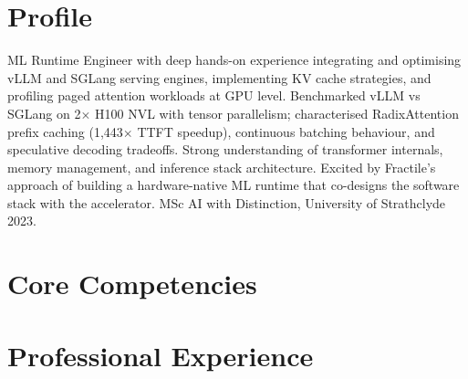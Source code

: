 \documentclass[11pt,a4paper]{moderncv}
\begin{document}
\makecvtitle

\section{Profile}
ML Runtime Engineer with deep hands-on experience integrating and optimising vLLM and SGLang serving engines, implementing KV cache strategies, and profiling paged attention workloads at GPU level. Benchmarked vLLM vs SGLang on 2$\times$ H100 NVL with tensor parallelism; characterised RadixAttention prefix caching (1,443$\times$ TTFT speedup), continuous batching behaviour, and speculative decoding tradeoffs. Strong understanding of transformer internals, memory management, and inference stack architecture. Excited by Fractile's approach of building a hardware-native ML runtime that co-designs the software stack with the accelerator. MSc AI with Distinction, University of Strathclyde 2023.

\section{Core Competencies}

\section{Professional Experience}
\end{document}
